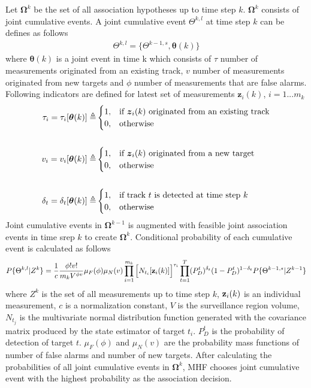 \documentclass{article}
\newcommand{\btheta}{\boldsymbol{\theta}}
\begin{document}
Let $\boldsymbol{\Omega}^k$ be the set of all association hypotheses up to time step $k$. $\boldsymbol{\Omega}^k$ consists of joint cumulative events. A joint cumulative event $\Theta^{k,l}$ at time step $k$ can be defines as follows
\begin{gather}
\Theta^{k,l} = \{ \Theta^{k-1,s}, \btheta(k) \}
\end{gather}
where $\btheta(k)$ is a joint event in time k which consists of $\tau$ number of measurements originated from an existing track, $v$ number of measurements originated from new targets and $\phi$ number of measurements that are false alarms. Following indicators are defined for latest set of measurements $\boldsymbol{z}_i(k)$, $i=1...m_k$
\begin{align}
\tau_i = \tau_i[\btheta(k)] \triangleq & \begin{cases}
    1, & \text{if $\boldsymbol{z}_i(k)$ originated from an existing track}\\
    0, & \text{otherwise}\\
  \end{cases}\\ \notag\\
v_i = v_i[\btheta(k)] \triangleq & \begin{cases}
    1, & \text{if $\boldsymbol{z}_i(k)$ originated from a new target}\\
    0, & \text{otherwise}\\
  \end{cases}\\ \notag\\
  \delta_t = \delta_t[\btheta(k)] \triangleq & \begin{cases}
    1, & \text{if track $t$ is detected at time step $k$}\\
    0, & \text{otherwise}\\
  \end{cases}
\end{align}
Joint cumulative events in $\boldsymbol{\Omega}^{k-1}$ is augmented with feasible joint association events in time srep $k$ to create $\boldsymbol{\Omega}^k$. Conditional probability of each cumulative event is calculated as follows
\begin{gather}
P\{\Theta^{k,l}|Z^k\} = \frac{1}{c} \frac{\phi!v!}{m_k V^{\phi v}} \mu_F(\phi) \mu_N(v) \prod_{i=1}^{m_k}\Big[N_{t_i}[\bold{z}_i(k)]\Big]^{\tau_i} \prod_{t=1}^T (P^t_D)^{\delta_t}(1-P^t_D)^{1-\delta_t} P\{\Theta^{k-1,s}|Z^{k-1}\}
\end{gather}
where $Z^k$ is the set of all measurements up to time step $k$, $\bold{z}_i(k)$ is an individual measurement, $c$ is a normalization constant, $V$ is the surveillance region volume, $N_{t_j}$ is the multivariate normal distribution function generated with the covariance matrix produced by the state estimator of target $t_i$. $P^t_D$ is the probability of detection of target $t$. $\mu_F(\phi)$ and  $\mu_N(v)$ are the probability mass functions of number of false alarms and number of new targets. After calculating the probabilities of all joint cumulative events in $\boldsymbol{\Omega}^k$, MHF chooses joint cumulative event with the highest probability as the association decision.
\end{document}
